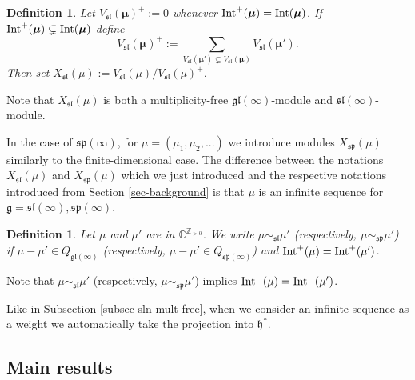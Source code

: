 \documentclass[12pt]{amsart}
\newcommand{\C}{{\mathbb C}}
\def\gg{\mathfrak{g}}
\def\gh{\mathfrak{h}}
\def\gh{\mathfrak h}
\newtheorem{defn}[thm]{Definition}
\begin{document}
\begin{defn}  \label{defn-infinite} Let  $V_{\mathfrak{sl}} (\boldsymbol{\mu})^+ := 0$ whenever ${\rm Int}^+ (\boldsymbol{\mu}) = {\rm Int} (\boldsymbol{\mu})$. If ${\rm Int}^+ (\boldsymbol{\mu}) \subsetneq {\rm Int} (\boldsymbol{\mu})$  define
$$
V_{\mathfrak{sl}} (\boldsymbol{\mu})^+ :=\sum_{V_{\mathfrak{sl}} (\boldsymbol{\mu'}) \subsetneq V_{\mathfrak{sl}} (\boldsymbol{\mu})} V_{\mathfrak{sl}} (\boldsymbol{\mu'}). 
$$
Then set $X_{\mathfrak{sl}}(\mu) := V_{\mathfrak{sl}} (\mu)/ V_{\mathfrak{sl}} (\mu)^+$.
\end{defn}
 Note that  $X_{\mathfrak{sl}}(\mu)$ is both a multiplicity-free  $\mathfrak{gl}(\infty)$-module and $\mathfrak{sl}(\infty)$-module. 
 
 In the case of  $\mathfrak{sp}(\infty)$, for $\mu = (\mu_1,\mu_2,...)$ we introduce  modules $X_{\mathfrak{sp}}(\mu)$ similarly to the finite-dimensional case.  The difference between the notations $X_{\mathfrak{sl}}(\mu)$ and $X_{\mathfrak{sp}}(\mu)$ which we just introduced and the respective notations introduced from  Section \ref{sec-background} is that $\mu$  is an infinite sequence for $\gg = \mathfrak{sl}(\infty), \mathfrak{sp}(\infty)$.
 
\begin{defn}
Let $\mu$ and $\mu'$ are in $\C^{{\mathbb Z}_{>0}}$.   We write $\mu \sim_{\mathfrak{sl}} \mu'$ (respectively, $\mu \sim_{\mathfrak{sp}} \mu'$) if  $\mu - \mu' \in Q_{\mathfrak{gl}(\infty)}$ (respectively, $ \mu - \mu' \in Q_{\mathfrak{sp}(\infty)}$) and ${\rm Int}^+ (\mu) = {\rm Int}^+ (\mu')$.\end{defn}
 Note that  $\mu \sim_{\mathfrak{sl}} \mu'$ (respectively, $\mu \sim_{\mathfrak{sp}} \mu'$) implies ${\rm Int}^- (\mu) = {\rm Int}^- (\mu')$. 

Like in Subsection \ref{subsec-sln-mult-free}, when we consider an infinite sequence as a weight we automatically take the projection into $\gh^*$.




\subsection{Main results}
\end{document}
